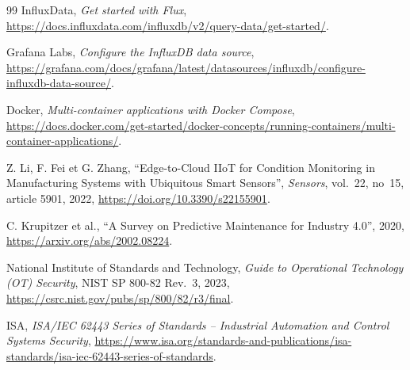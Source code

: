 \documentclass[12pt,a4paper,oneside]{report}
\begin{document}
\begin{thebibliography}{99}
InfluxData, \emph{Get started with Flux},
\url{https://docs.influxdata.com/influxdb/v2/query-data/get-started/}.

Grafana Labs, \emph{Configure the InfluxDB data source},
\url{https://grafana.com/docs/grafana/latest/datasources/influxdb/configure-influxdb-data-source/}.

Docker, \emph{Multi-container applications with Docker Compose},
\url{https://docs.docker.com/get-started/docker-concepts/running-containers/multi-container-applications/}.

Z. Li, F. Fei et G. Zhang, ``Edge-to-Cloud IIoT for Condition Monitoring in
Manufacturing Systems with Ubiquitous Smart Sensors'', \emph{Sensors},
vol.~22, no~15, article 5901, 2022,
\url{https://doi.org/10.3390/s22155901}.

C. Krupitzer et al., ``A Survey on Predictive Maintenance for Industry
4.0'', 2020,
\url{https://arxiv.org/abs/2002.08224}.

National Institute of Standards and Technology, \emph{Guide to Operational
Technology (OT) Security}, NIST SP 800-82 Rev.~3, 2023,
\url{https://csrc.nist.gov/pubs/sp/800/82/r3/final}.

ISA, \emph{ISA/IEC 62443 Series of Standards -- Industrial Automation and
Control Systems Security},
\url{https://www.isa.org/standards-and-publications/isa-standards/isa-iec-62443-series-of-standards}.

\end{thebibliography}
\end{document}
